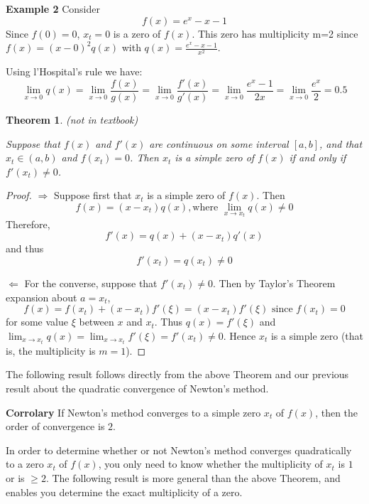 \documentclass [titlepage,12pt,letter] {article}
\newtheorem{theorem}{Theorem}
\begin{document}
\noindent 
{\bf Example 2}  Consider 
\[
f(x) = e^x - x - 1
\]
\noindent 
Since $f(0)=0$, $x_t =0$ is a zero of $f(x)$. This zero has
multiplicity m=2 since $f(x) = (x-0)^2q(x)$ with $q(x) = \frac{e^x - x
  -1}{x^2}$.

\medskip 
\noindent 
Using l'Hospital's rule we have: 
\[
\lim_{x \rightarrow 0} q(x) = \lim_{x \rightarrow 0} \frac{f(x)}{g(x)} = \lim_{x \rightarrow 0} \frac{f'(x)}{g'(x)} = \lim_{x \rightarrow 0} \frac{e^x -1}{2x} = \lim_{x \rightarrow 0} \frac{e^x}{2} = 0.5 
\]
\noindent 

\begin{theorem} (not in textbook)

Suppose that $f(x)$ and $f'(x)$ are continuous on some interval $[a, b]$, 
and that $x_t \in (a,b)$ and $f(x_t)=0$. Then $x_t$ is a simple zero of $f(x)$ 
if and only if $f'(x_t) \neq 0$. 
\end{theorem}
\noindent 

\begin{proof}

$\Rightarrow$ Suppose first that $x_t$ is a simple zero of $f(x)$. Then 
\[
   f(x) = (x - x_t) q(x), \mbox{where } \lim_{x \rightarrow x_t} q(x) \neq 0
\] 
\noindent 
Therefore, 
\[ 
f'(x) = q(x) + (x - x_t) q'(x) 
\]
\noindent 
and thus 
\[
f'(x_t) = q(x_t) \neq 0
\]

\noindent
$\Leftarrow$ For the converse, suppose that $f'(x_t) \neq 0$. Then by Taylor's Theorem expansion about $a = x_t$, 
\[ 
f(x) = f(x_t) + (x-x_t) f'(\xi)= (x - x_t) f'(\xi) \mbox{ since } f(x_t) = 0
\]
\noindent 
for some value $\xi$ between $x$ and $x_t$. Thus $q(x) = f'(\xi)$ and 
$\lim_{x \rightarrow x_t} q(x) = \lim_{x \rightarrow x_t} f'(\xi) = f'(x_t) \neq 0$. Hence $x_t$ is a simple zero (that is, the multiplicity is $m=1$). 

\end{proof}

\noindent 
The following result follows directly from the above Theorem and our 
previous result about the quadratic convergence of Newton's method.
 
\noindent 
{\bf Corrolary} If Newton’s method converges to a simple zero $x_t$ of $f(x)$, 
then the order of convergence is $2$. 

In order to determine whether or not Newton’s method converges
quadratically to a zero $x_t$ of $f(x)$, you only need to know whether
the multiplicity of $x_t$ is $1$ or is $\geq 2$. The following result
is more general than the above Theorem, and enables you determine the
exact multiplicity of a zero.
\end{document}
